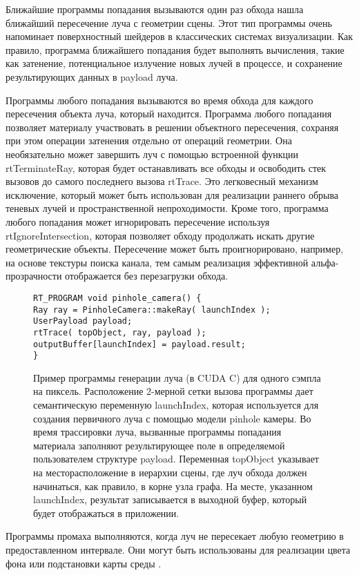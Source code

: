 Ближайшие программы попадания вызываются один раз обхода нашла ближайший  пересечение луча с геометрии сцены.
 Этот тип программы очень напоминает поверхностный шейдеров в классических системах визуализации.
 Как правило, программа ближайшего попадания будет выполнять вычисления, такие как затенение, потенциальное излучение новых лучей в процессе, и сохранение результирующих данных в payload луча.

Программы любого попадания вызываются во время обхода для каждого пересечения объекта луча, который находится.
Программа любого попадания позволяет материалу участвовать в решении объектного пересечения, сохраняя при этом операции затенения отдельно от операций геометрии.
Она необязательно может завершить луч с помощью встроенной функции rtTerminateRay, которая будет останавливать все обходы и освободить стек вызовов до самого последнего вызова rtTrace.
Это легковесный механизм исключение, который может быть использован для реализации раннего обрыва теневых лучей и пространственной непроходимости.
Кроме того, программа любого попадания может игнорировать пересечение используя rtIgnoreIntersection, которая позволяет обходу продолжать искать другие геометрические объекты.
Пересечение может быть проигнорировано, например, на основе текстуры поиска канала, тем самым реализация эффективной альфа-прозрачности отображается без перезагрузки обхода.
\begin{figure}[h]
\begin{verbatim}
RT_PROGRAM void pinhole_camera() {
Ray ray = PinholeCamera::makeRay( launchIndex );
UserPayload payload;
rtTrace( topObject, ray, payload );
outputBuffer[launchIndex] = payload.result;
}
\end{verbatim}
\caption{Пример программы генерации луча (в CUDA C) для одного сэмпла на пиксель.
Расположение 2-мерной сетки вызова программы дает семантическую переменную launchIndex, которая используется для создания первичного луча с помощью модели pinhole камеры.
Во время трассировки луча, вызванные программы попадания материала заполняют результирующее поле в определяемой пользователем структуре payload.
Переменная topObject указывает на месторасположение в иерархии сцены, где луч обхода должен начинаться, как правило, в корне узла графа.
На месте, указанном launchIndex, результат записывается в выходной буфер, который будет отображаться в приложении.}
\end{figure}

  Программы промаха выполняются, когда луч не пересекает любую геометрию в предоставленном интервале.
  Они могут быть использованы для реализации цвета фона или подстановки карты среды .

